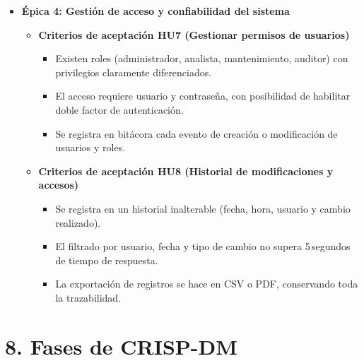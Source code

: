 \documentclass[
11pt, %
]{ProyectoVpC}
\begin{document}
\begin{itemize}
  \item \textbf{\'{E}pica 4: Gestión de acceso y confiabilidad del sistema}
    \begin{itemize}
      \item \textbf{Criterios de aceptación HU7 (Gestionar permisos de usuarios)}
        \begin{itemize}
          \item Existen roles (administrador, analista, mantenimiento, auditor) con privilegios claramente diferenciados.
          \item El acceso requiere usuario y contraseña, con posibilidad de habilitar doble factor de autenticación.
          \item Se registra en bitácora cada evento de creación o modificación de usuarios y roles.
        \end{itemize}

      \item \textbf{Criterios de aceptación HU8 (Historial de modificaciones y accesos)}
        \begin{itemize}
          \item Se registra en un historial inalterable (fecha, hora, usuario y cambio realizado).
          \item El filtrado por usuario, fecha y tipo de cambio no supera 5\,segundos de tiempo de respuesta.
          \item La exportación de registros se hace en CSV o PDF, conservando toda la trazabilidad.
        \end{itemize}
    \end{itemize}
\end{itemize}

\section{8. Fases de CRISP-DM}
\end{document}
